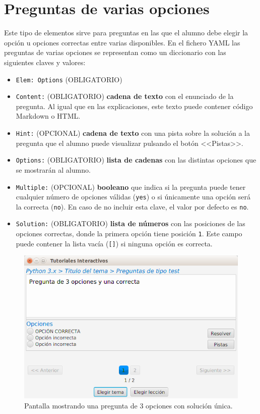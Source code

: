 \documentclass[]{article}
\newcommand{\code}[1]{{\lstinline[basicstyle=\ttfamily,mathescape]!#1!}}
\begin{document}
\section{Preguntas de varias opciones}
Este tipo de elementos sirve para preguntas en las que el alumno debe elegir la opción u opciones correctas entre varias disponibles. En el fichero YAML las preguntas de varias opciones se representan como un diccionario con las siguientes claves y valores:
\begin{itemize}
	\item \code{Elem: Options} {\sf (OBLIGATORIO)}
	\item \code{Content:} {\sf (OBLIGATORIO)} \textbf{cadena de texto} con el enunciado de la pregunta. Al igual que en las explicaciones, este texto puede contener código Markdown o HTML. 
 	\item \code{Hint:} {\sf (OPCIONAL)} \textbf{cadena de texto} con una pista sobre la solución a la pregunta que el alumno puede visualizar pulsando el botón <<Pistas>>.
 	\item \code{Options:} {\sf (OBLIGATORIO)} \textbf{lista de cadenas} con las distintas opciones que se mostrarán al alumno.
 	\item \code{Multiple:} {\sf (OPCIONAL)} \textbf{booleano} que indica si la pregunta puede tener cualquier número de opciones válidas (\code{yes}) o si únicamente una opción será la correcta (\code{no}). En caso de no incluir esta clave, el valor por defecto es \code{no}.
 	\item \code{Solution:} {\sf (OBLIGATORIO)} \textbf{lista de números} con las posiciones de las opciones correctas, donde la primera opción tiene posición \code{1}. Este campo puede contener la lista vacía (\code{[]}) si ninguna opción es correcta.
\end{itemize}

\begin{figure}[tb]
	\centerline{\includegraphics[scale=0.5]{opciones}}
	\caption{Pantalla mostrando una pregunta de 3 opciones con solución única.\label{fig:opciones}}
\end{figure}
\end{document}
